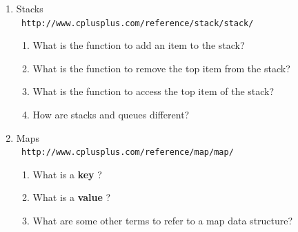 \documentclass[a4paper,12pt]{book}
\begin{document}
\begin{enumerate}
                    \item Stacks \\ \texttt{ http://www.cplusplus.com/reference/stack/stack/ }
                        \begin{enumerate}
                            \item What is the function to add an item to the stack?
                            \item What is the function to remove the top item from the stack?
                            \item What is the function to access the top item of the stack?
                            \item How are stacks and queues different?
                        \end{enumerate}

                    \item Maps \\   \texttt{ http://www.cplusplus.com/reference/map/map/ }
                        \begin{enumerate}
                            \item What is a \textbf{ key }?
                            \item What is a \textbf{ value }?
                            \item What are some other terms to refer to a map data structure?
                        \end{enumerate}

                \end{enumerate}
            
\end{document}
